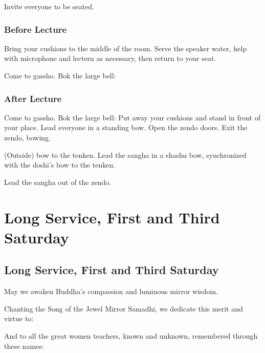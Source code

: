 \documentclass{kdo}
\begin{document}
\begin{services}
\doshi Invite everyone to be seated.

\section*{Before Lecture}
\sangha Bring your cushions to the middle of the room.
\kokyo Serve the speaker water, help with microphone and lectern as necessary,
then return to your seat.

\doshi Come to gassho.
\doan Bok the large bell: \bigspace\bok
\sangha \sutraOpeningVerse*
\newpage

\section*{After Lecture}
\doshi Come to gassho.
\doan Bok the large bell: \bigspace\bok
\sangha \fourVows*
\sangha Put away your cushions and stand in front of your place.
\doshi Lead everyone in a standing bow.
\tenken Open the zendo doors.
\doshi Exit the zendo, bowing.

(Outside) bow to the tenken.
\doan Lead the sangha in a shashu bow, synchronized with the doshi's bow to
the tenken.

Lead the sangha out of the zendo.

\part{Long Service, First and Third Saturday}
\chapter{Long Service, First and Third Saturday}
\begin{service}
\kokyo \makaHannyaHaramittaShingyo
\pagebreak
\kokyo \enmeiJukkuKannonGyo
\kokyo {}
\sangha \allBuddhas*
\kokyo \songOfTheJewelMirrorSamadhi
\kokyo May we awaken Buddha's compassion and luminous mirror wisdom.

Chanting the Song of the Jewel Mirror Samadhi, we dedicate this merit and
virtue to: \bigspace\clank

\begin{outdent}
  \ancestorsShort*
\end{outdent}

\kokyo And to all the great women teachers, known and unknown, remembered
through these names: \bigspace\clank


\end{service}
\end{services}
\end{document}
